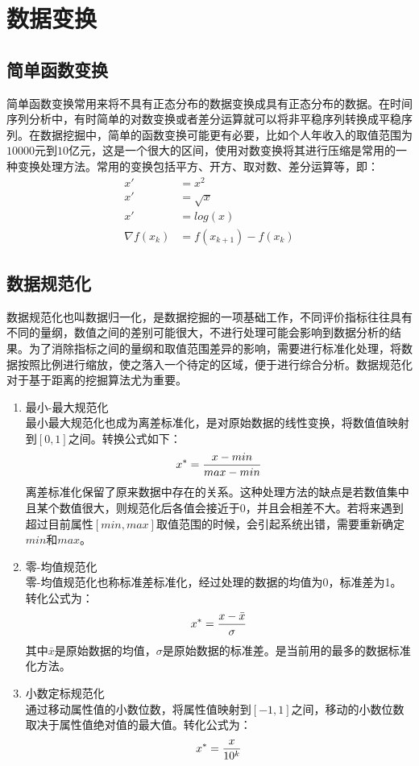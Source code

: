 \documentclass[openany]{progbookcn}
\begin{document}
\section{数据变换}
\subsection{简单函数变换}
\indent 简单函数变换常用来将不具有正态分布的数据变换成具有正态分布的数据。在时间序列分析中，有时简单的对数变换或者差分运算就可以将非平稳序列转换成平稳序列。在数据挖掘中，简单的函数变换可能更有必要，比如个人年收入的取值范围为$10000$元到$10$亿元，这是一个很大的区间，使用对数变换将其进行压缩是常用的一种变换处理方法。常用的变换包括平方、开方、取对数、差分运算等，即：
\begin{equation}\nonumber
\begin{aligned}
x'&=x^2\\
x'&=\sqrt{x}\\
x'&=log(x)\\
\nabla f(x_k)&=f(x_{k+1})-f(x_k)
\end{aligned}
\end{equation}
\subsection{数据规范化}
\indent 数据规范化也叫数据归一化，是数据挖掘的一项基础工作，不同评价指标往往具有不同的量纲，数值之间的差别可能很大，不进行处理可能会影响到数据分析的结果。为了消除指标之间的量纲和取值范围差异的影响，需要进行标准化处理，将数据按照比例进行缩放，使之落入一个待定的区域，便于进行综合分析。数据规范化对于基于距离的挖掘算法尤为重要。
\begin{enumerate}[itemindent=2em]
\item 最小-最大规范化\\
\indent 最小最大规范化也成为离差标准化，是对原始数据的线性变换，将数值值映射到$[0,1]$之间。转换公式如下：
\begin{equation}
x^*={{x-min}\over{max-min}}
\end{equation}
\indent 离差标准化保留了原来数据中存在的关系。这种处理方法的缺点是若数值集中且某个数值很大，则规范化后各值会接近于$0$，并且会相差不大。若将来遇到超过目前属性$[min,max]$取值范围的时候，会引起系统出错，需要重新确定$min$和$max$。
\item 零-均值规范化\\
\indent 零-均值规范化也称标准差标准化，经过处理的数据的均值为0，标准差为1。转化公式为：
\begin{equation}
x^*={{x-{\bar x}}\over{\sigma}}
\end{equation}
\indent 其中${\bar x}$是原始数据的均值，$\sigma$是原始数据的标准差。是当前用的最多的数据标准化方法。
\item 小数定标规范化\\
\indent 通过移动属性值的小数位数，将属性值映射到$[-1,1]$之间，移动的小数位数取决于属性值绝对值的最大值。转化公式为：
\begin{equation}
x^*={{x}\over{10^k}}
\end{equation}
\end{enumerate}
\end{document}
